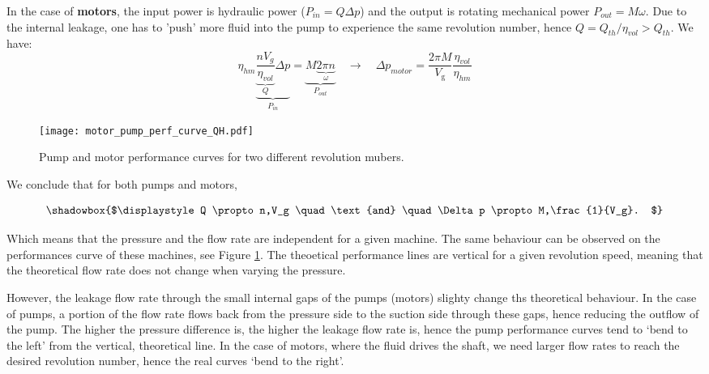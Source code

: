 In the case of {\bf motors}, the input power is hydraulic power ($P_{in}=Q \Delta p$) and the output is rotating mechanical power $P_{out}=M \omega$. Due to the internal leakage, one has to 'push' more fluid into the pump to experience the same revolution number, hence $Q=Q_{th}/\eta_{vol}>Q_{th}$. We have:
%
\begin{equation}
\eta_{hm} 
\underbrace{
\underbrace{
\frac{n V_g}{\eta_{vol}}
}_Q
\Delta p}_{P_{in}}=\underbrace{M \underbrace{2\pi n}_{\omega}}_{P_{out}}
\quad \rightarrow \quad
\Delta p_{motor}=\frac{2\pi M}{V_{\mathrm{g}}}\frac{\eta_{vol}}{\eta_{hm}}
\end{equation}

\begin{figure}[ht]
\begin{center}
\texttt{[image: motor\_pump\_perf\_curve\_QH.pdf]}
\caption{\label{fig:pump_and_motor_perf_curve}Pump and motor performance curves for two different revolution mubers.}
\end{center}
\end{figure}

\noindent We conclude that for both pumps and motors,

\begin{equation}
\shadowbox{$\displaystyle
Q \propto n,V_g \quad \text{and} \quad \Delta p \propto M,\frac{1}{V_g}.
$}
\end{equation}

\noindent Which means that the pressure and the flow rate are independent for a given machine. The same behaviour can be observed on the performances curve of these machines, see Figure \ref{fig:pump_and_motor_perf_curve}. The theoetical performance lines are vertical for a given revolution speed, meaning that the theoretical flow rate does not change when varying the pressure.

However, the leakage flow rate through the small internal gaps of the pumps (motors) slighty change ths theoretical behaviour. In the case of pumps, a portion of the flow rate flows back from the pressure side to the suction side through these gaps, hence reducing the outflow of the pump. The higher the pressure difference is, the higher the leakage flow rate is, hence the pump performance curves tend to `bend to the left' from the vertical, theoretical line. In the case of motors, where the fluid drives the shaft, we need larger flow rates to reach the desired revolution number, hence the real curves `bend to the right'.

\clearpage

